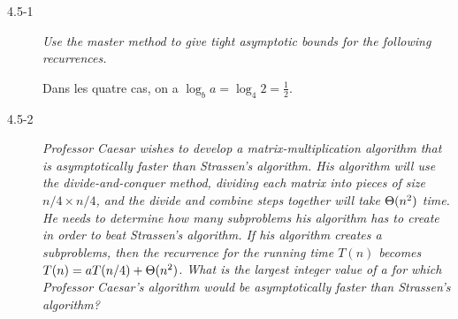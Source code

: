 \begin{description}
 
  \item[4.5-1] {\itshape Use the master method to give tight asymptotic bounds for the following recurrences.}
    
    \begin{ex}
      Dans les quatre cas, on a $\log_b a = \log_4 2 = \frac{1}{2}$.
      \begin{Al}
    \item $f(n) = 1 = \O (n^{\log_4 2-\eps})$ avec $\eps \in ]0, 1]$, donc $T(n) = \Th(\sqrt{n})$.
      \item $f(n) = \sqrt{n} = \Th(\sqrt{n})$, donc $T(n) = \Theta(\sqrt{n}\lg n)$.
    \item $f(n) = n = \Omega(n^{\log_4 2+\eps})$ avec $\eps \in ]0,2]$,  de plus $af(n/b) = n/2 \le cf(n) = cn$ avec $ 1/2 \le c < 1 $, donc $T(n) = \Th(n)$.
      \item $f(n) = n^2 = \Omega(n^{\log_4 2+\eps})$ avec $\eps \in ]0, 14] $, de plus $af(n/b) = n^2/8 \le c f(n)$ avec $ 1/8 \le c < 1$, donc $T(n) = \Th(n^2)$.
      \end{Al}
    \end{ex}

  \item[4.5-2] {\itshape Professor Caesar wishes to develop a matrix-multiplication algorithm that is asymptotically faster than Strassen’s algorithm. His algorithm will use the divide-and-conquer method, dividing each matrix into pieces of size $n/4 \times n/4$, and the divide and combine steps together will take $\Theta(n^2)$ time. He needs to determine how many subproblems his algorithm has to create in order to beat Strassen’s algorithm. If his algorithm creates a subproblems, then the recurrence for the running time $T(n)$ becomes $T(n) =  aT(n/4) + \Theta(n^2)$. What is the largest integer value of a for which Professor Caesar’s algorithm would be asymptotically faster than Strassen’s algorithm?}
    \begin{exrev}
      
    \end{exrev}
 

\end{description}
